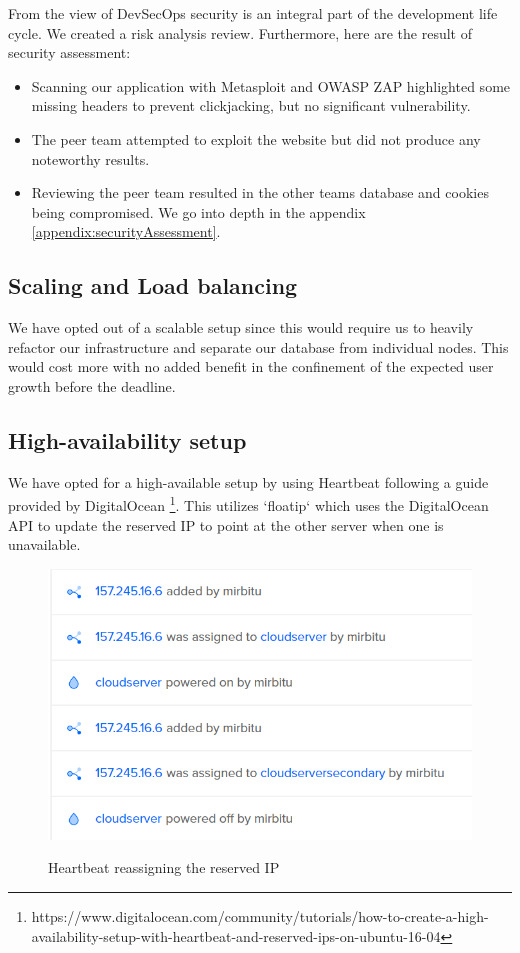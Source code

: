 \documentclass{article}
\begin{document}
From the view of DevSecOps security is an integral part of the development life cycle. We created a risk analysis review. Furthermore, here are the result of security assessment: 

\begin{itemize}
    \item Scanning our application with Metasploit and OWASP ZAP highlighted some missing headers to prevent clickjacking, but no significant vulnerability. 
    \item The peer team attempted to exploit the website but did not produce any noteworthy results. 
    \item Reviewing the peer team resulted in the other teams database and cookies being compromised. We go into depth in the appendix \ref{appendix:securityAssessment}.
\end{itemize}


\subsection{Scaling and Load balancing}

We have opted out of a scalable setup since this would require us to heavily refactor our infrastructure and separate our database from individual nodes. This would cost more with no added benefit in the confinement of the expected user growth before the deadline.  

\subsection{High-availability setup}

We have opted for a high-available setup by using Heartbeat following a guide provided by DigitalOcean \footnote{https://www.digitalocean.com/community/tutorials/how-to-create-a-high-availability-setup-with-heartbeat-and-reserved-ips-on-ubuntu-16-04}. This utilizes `floatip` which uses the DigitalOcean API to update the reserved IP to point at the other server when one is unavailable. 

\begin{figure}[h]
    \includegraphics[scale=0.7]{images/Heartbeat_Working.png}
    \label{fig:cd_pipeline}
    \caption{Heartbeat reassigning the reserved IP}
    \centering
\end{figure}
\end{document}
